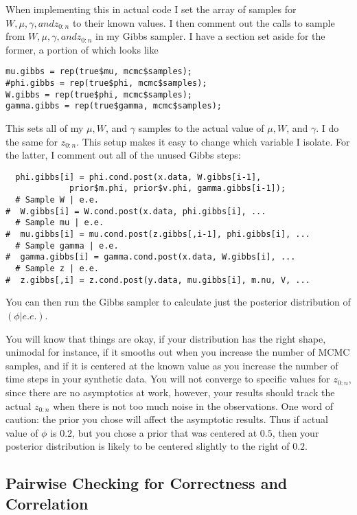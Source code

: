 \documentclass{article}
\begin{document}
When implementing this in actual code I set the array of samples for $W, \mu, \gamma, and z_{0:n}$ to their known values.  I then comment out the calls to sample from $W, \mu, \gamma, and z_{0:n}$ in my Gibbs sampler.  I have a section set aside for the former, a portion of which looks like
\begin{verbatim}
mu.gibbs = rep(true$mu, mcmc$samples);
#phi.gibbs = rep(true$phi, mcmc$samples);
W.gibbs = rep(true$phi, mcmc$samples);
gamma.gibbs = rep(true$gamma, mcmc$samples);
\end{verbatim}
This sets all of my $\mu, W$, and $\gamma$ samples to the actual value of $\mu, W$, and $\gamma$.  I do the same for $z_{0:n}$.  This setup makes it easy to change which variable I isolate.  For the latter, I comment out all of the unused Gibbs steps:
\begin{verbatim}
  phi.gibbs[i] = phi.cond.post(x.data, W.gibbs[i-1],
             prior$m.phi, prior$v.phi, gamma.gibbs[i-1]);
  # Sample W | e.e.
#  W.gibbs[i] = W.cond.post(x.data, phi.gibbs[i], ...
  # Sample mu | e.e.
#  mu.gibbs[i] = mu.cond.post(z.gibbs[,i-1], phi.gibbs[i], ...
  # Sample gamma | e.e.
#  gamma.gibbs[i] = gamma.cond.post(x.data, W.gibbs[i], ...
  # Sample z | e.e.
#  z.gibbs[,i] = z.cond.post(y.data, mu.gibbs[i], m.nu, V, ... 
\end{verbatim}
You can then run the Gibbs sampler to calculate just the posterior distribution of $(\phi | e.e.)$.

You will know that things are okay, if your distribution has the right shape, unimodal for instance, if it smooths out when you increase the number of MCMC samples, and if it is centered at the known value as you increase the number of time steps in your synthetic data.  You will not converge to specific values for $z_{0:n}$, since there are no asymptotics at work, however, your results should track the actual $z_{0:n}$ when there is not too much noise in the observations. One word of caution: the prior you chose will affect the asymptotic results.  Thus if actual value of $\phi$ is $0.2$, but you chose a prior that was centered at $0.5$, then your posterior distribution is likely to be centered slightly to the right of $0.2$.

\subsection{Pairwise Checking for Correctness and Correlation}
\end{document}
